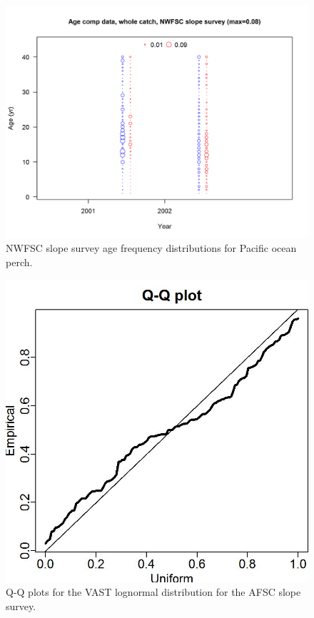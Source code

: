 \documentclass[12pt,]{article}
\begin{document}
\FloatBarrier

\begin{figure}
\centering
\includegraphics{r4ss/plots_mod1/comp_agedat_bubflt7mkt0.png}
\caption{NWFSC slope survey age frequency distributions for Pacific
ocean perch. \label{fig:nw_slope_Age}}
\end{figure}

\FloatBarrier

\begin{figure}
\centering
\includegraphics{Figures/Q-Q_plot_afsc.jpg}
\caption{Q-Q plots for the VAST lognormal distribution for the AFSC
slope survey. \label{fig:afsc_qq}}
\end{figure}
\end{document}
